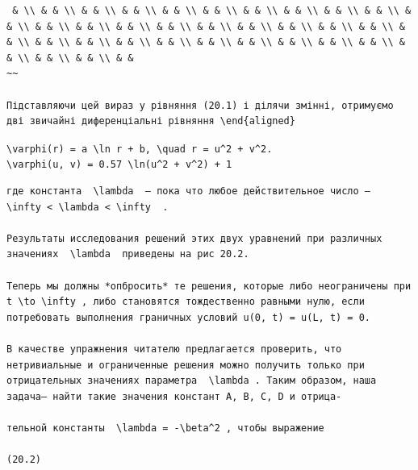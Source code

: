 \documentclass[
  ukrainian,
]{article}
\begin{document}
\begin{verbatim}
 & \\ & & \\ & & \\ & & \\ & & \\ & & \\ & & \\ & & \\ & & \\ & & \\ & & \\ & & \\ & & \\ & & \\ & & \\ & & \\ & & \\ & & \\ & & \\ & & \\ & & \\ & & \\ & & \\ & & \\ & & \\ & & \\ & & \\ & & \\ & & \\ & & \\ & & \\ & & \\ & & \\ & &
~~

Підставляючи цей вираз у рівняння (20.1) і ділячи змінні, отримуємо дві звичайні диференціальні рівняння \end{aligned}
\end{verbatim}

\texttt{\textbackslash{}varphi(r)\ =\ a\ \textbackslash{}ln\ r\ +\ b,\ \textbackslash{}quad\ r\ =\ u\^{}2\ +\ v\^{}2.}
\texttt{\textbackslash{}varphi(u,\ v)\ =\ 0.57\ \textbackslash{}ln(u\^{}2\ +\ v\^{}2)\ +\ 1}

\begin{verbatim}
где константа  \lambda  — пока что любое действительное число —  \infty < \lambda < \infty  .

Результаты исследования решений этих двух уравнений при различных значениях  \lambda  приведены на рис 20.2.

Теперь мы должны *опбросить* те решения, которые либо неограничены при  t \to \infty , либо становятся тождественно равными нулю, если потребовать выполнения граничных условий u(0, t) = u(L, t) = 0.

В качестве упражнения читателю предлагается проверить, что нетривиальные и ограниченные решения можно получить только при отрицательных значениях параметра  \lambda . Таким образом, наша задача— найти такие значения констант A, B, C, D и отрица-

тельной константы  \lambda = -\beta^2 , чтобы выражение

(20.2)
\end{verbatim}
\end{document}

